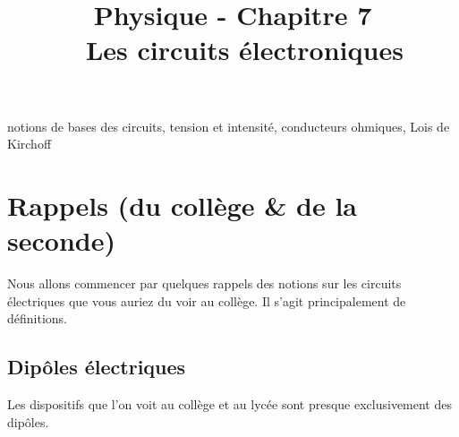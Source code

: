 \documentclass[11pt,a4paper]{article}
\title{\large Physique - Chapitre 7 \\ \LARGE  Les circuits électroniques}
\date{}
\author{}
\begin{document}
\maketitle
\vspace{-1cm}
\begin{tcolorbox}[title=Notions de la classe de première à rappeler]
notions de bases des circuits, tension et intensité, conducteurs ohmiques, Lois de Kirchoff
\end{tcolorbox}
\tableofcontents

\section{Rappels (du collège \& de la seconde)}
Nous allons commencer par quelques rappels des notions sur les circuits électriques que vous auriez du voir au collège. Il s'agit principalement de définitions.

\subsection{Dipôles électriques}

Les dispositifs que l'on voit au collège et au lycée sont presque exclusivement des dipôles. 
\end{document}

